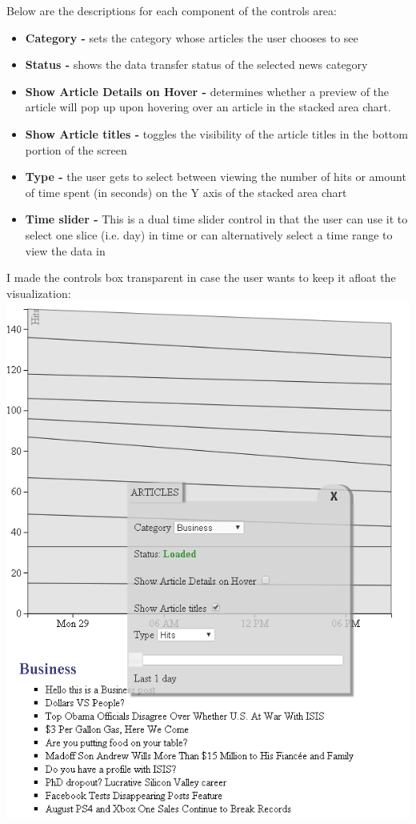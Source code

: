 \documentclass[12pt]{article}
\begin{document}
\newpage

\noindent Below are the descriptions for each component of the controls area:

\begin{itemize}
\item \textbf{Category - } sets the category whose articles the user chooses to see
\item \textbf{Status - } shows the data transfer status of the selected news category
\item \textbf{Show Article Details on Hover - } determines whether a preview of the article will pop up upon hovering over an article in the stacked area chart. 
\item \textbf{Show Article titles - } toggles the visibility of the article titles in the bottom portion of the screen
\item \textbf{Type - } the user gets to select between viewing the number of hits or amount of time spent (in seconds) on the Y axis of the stacked area chart
\item \textbf{Time slider - } This is a dual time slider control in that the user can use it to select one slice (i.e. day) in time or can alternatively select a time range to view the data in 
\end{itemize}

\newpage

\noindent I made the controls box transparent in case the user wants to keep it afloat the visualization: \\

\noindent\includegraphics[scale=0.8]{img/viz_6}
\end{document}
